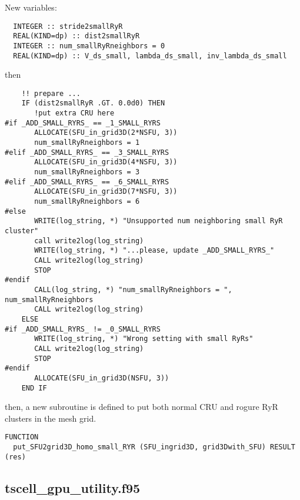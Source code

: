 New variables:
\begin{verbatim}
  INTEGER :: stride2smallRyR
  REAL(KIND=dp) :: dist2smallRyR
  INTEGER :: num_smallRyRneighbors = 0
  REAL(KIND=dp) :: V_ds_small, lambda_ds_small, inv_lambda_ds_small
\end{verbatim}
then
\begin{verbatim}
    !! prepare ...	
    IF (dist2smallRyR .GT. 0.0d0) THEN 
       !put extra CRU here
#if _ADD_SMALL_RYRS_ == _1_SMALL_RYRS
       ALLOCATE(SFU_in_grid3D(2*NSFU, 3))
       num_smallRyRneighbors = 1
#elif _ADD_SMALL_RYRS_ == _3_SMALL_RYRS
       ALLOCATE(SFU_in_grid3D(4*NSFU, 3))
       num_smallRyRneighbors = 3
#elif _ADD_SMALL_RYRS_ == _6_SMALL_RYRS
       ALLOCATE(SFU_in_grid3D(7*NSFU, 3))
       num_smallRyRneighbors = 6
#else
       WRITE(log_string, *) "Unsupported num neighboring small RyR cluster"
       call write2log(log_string)
       WRITE(log_string, *) "...please, update _ADD_SMALL_RYRS_"
       CALL write2log(log_string)
       STOP       
#endif
       CALL(log_string, *) "num_smallRyRneighbors = ", num_smallRyRneighbors
       CALL write2log(log_string)
    ELSE
#if _ADD_SMALL_RYRS_ != _0_SMALL_RYRS
       WRITE(log_string, *) "Wrong setting with small RyRs"
       CALL write2log(log_string)
       STOP
#endif
       ALLOCATE(SFU_in_grid3D(NSFU, 3))
    END IF
\end{verbatim}
then, a new subroutine is defined to put both normal CRU and rogure RyR clusters
in the mesh grid.
\begin{verbatim}
FUNCTION
  put_SFU2grid3D_homo_small_RYR (SFU_ingrid3D, grid3Dwith_SFU) RESULT (res)
\end{verbatim}


\subsection{tscell\_gpu\_utility.f95}
\label{sec:tscell_gpu_utility}

